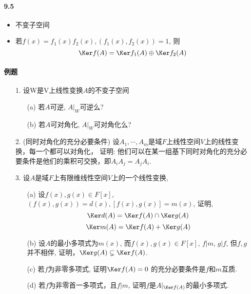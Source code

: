 \paragraph{9.5}
\begin{itemize}
    \item 不变子空间
    \item 若$f(x)=f_1(x)f_2(x), (f_1(x),f_2(x))=1$, 则
     $$\Ker f(A) = \Ker f_1(A) \oplus \Ker f_2(A)$$
\end{itemize}

\paragraph{例题}
\begin{itemize}
	\item [1.] 设W是V上线性变换$A$的不变子空间
	\begin{itemize}
		\item[(a)] 若$A$可逆, $A|_W$可逆么?
		\item[(b)] 若$A$可对角化, $A|_W$可对角化么? 
	\end{itemize}
	\vspace{3cm}

    \item [2.] (同时对角化的充分必要条件) 设$A_1, \cdots, A_m$是域$F$上线性空间$V$上的线性变换，每一个都可以对角化，
    证明: 他们可以在某一组基下同时对角化的充分必要条件是他们的乘积可交换，即$A_i A_j = A_j A_i$.
    \vspace{4cm}

    \item [3.] 设$A$是域$F$上有限维线性空间$V$上的一个线性变换,
    \begin{itemize}
        \item [(a) ] 设$f(x),g(x) \in F[x]$,
		$(f(x),g(x))=d(x), \left[f(x),g(x)\right]=m(x)$, 证明,
        $$\Ker d(A) = \Ker f(A) \cap \Ker g(A)$$
        $$\Ker m(A) = \Ker f(A) + \Ker g(A)$$
		\vspace{2cm}

        \item [(b) ] 设$A$的最小多项式为$m(x)$, 而$f(x),g(x) \in F[x]$, 
		$f|m$, $g|f$, 但$f,g$并不相伴, 证明，$\Ker g(A) \subsetneq \Ker f(A)$.
        \vspace{3cm}
		
		\item [(c)] 若$f$为非零多项式, 证明$\Ker f(A)={0}$ 的充分必要条件是$f$和$m$互质.
		\vspace{3cm}

		\item [(d)] 若$f$为非零首一多项式，且$f|m$, 证明$f$是$A|_{\Ker f(A)}$的最小多项式.
		\vspace{3cm}
    \end{itemize}
    \vspace{4cm}
\end{itemize}


